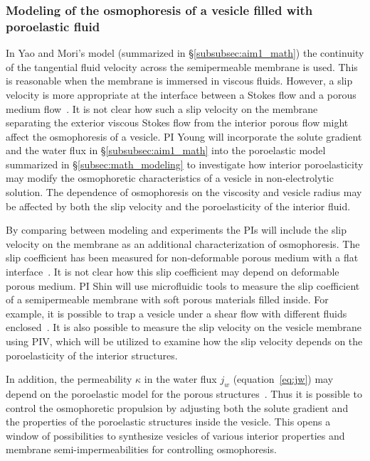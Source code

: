 \documentclass[11pt]{article}
\begin{document}
 
\subsubsection{Modeling of the osmophoresis of a vesicle filled with
poroelastic fluid}
\label{subsec:math_model_porous_vesicle}
In Yao and Mori's model (summarized in \S \ref{subsubsec:aim1_math}) the
continuity of the tangential fluid velocity across the semipermeable
membrane is used.  This is reasonable when the membrane is immersed in
viscous fluids.  However, a slip velocity is more appropriate at the
interface between a Stokes flow and a porous medium
flow~\cite{MacMinn2016_PRApplied, Angot2017_PRE}.  It is not clear how
such a slip velocity on the membrane separating the exterior viscous
Stokes flow from the interior porous flow might affect the osmophoresis
of a vesicle.  PI Young will incorporate the solute gradient and the
water flux in \S\ref{subsubsec:aim1_math} into the poroelastic model
summarized in \S\ref{subsec:math_modeling} to investigate how interior
poroelasticity may modify the osmophoretic characteristics of a vesicle
in non-electrolytic solution.  The dependence of osmophoresis on the
viscosity and vesicle radius may be affected by both the slip velocity
and the poroelasticity of the interior fluid. 

By comparing between modeling and experiments the PIs will include the
slip velocity on the membrane as an additional characterization of
osmophoresis. The slip coefficient has been measured for non-deformable
porous medium with a flat interface~\cite{BeaversJoseph1967_JFM,
LaugaBrennerStone2007_chapter19,  LaugaStone2003_JFM}.  It is not clear
how this slip coefficient may depend on deformable porous medium. PI
Shin will use microfluidic tools to measure the slip coefficient of a
semipermeable membrane with soft porous materials filled inside. For
example, it is possible to trap a vesicle under a shear flow with
different fluids enclosed~\cite{shin2015}. It is also possible to
measure the slip velocity on the vesicle membrane using PIV, which will
be utilized to examine how the slip velocity depends on the
poroelasticity of the interior structures.

In addition, the permeability $\kappa$ in the water flux $j_w$
(equation~\eqref{eq:jw}) may depend on the poroelastic model for the
porous structures~\cite{MacMinn2016_PRApplied}.  Thus it is possible to
control the osmophoretic propulsion by adjusting both the solute
gradient and the  properties of the poroelastic structures inside the
vesicle. This opens a window of possibilities to synthesize vesicles of
various interior properties and membrane semi-impermeabilities for
controlling osmophoresis.
\end{document}
